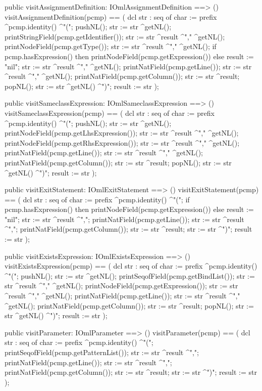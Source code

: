 \begin{vdm_al}
  public visitAssignmentDefinition: IOmlAssignmentDefinition ==> ()
  visitAssignmentDefinition(pcmp) ==
    ( dcl str : seq of char := prefix ^pcmp.identity() ^"(";
      pushNL();
      str := str ^getNL();
      printStringField(pcmp.getIdentifier());
      str := str ^result ^"," ^getNL();
      printNodeField(pcmp.getType());
      str := str ^result ^"," ^getNL();
      if pcmp.hasExpression()
      then printNodeField(pcmp.getExpression())
      else result := "nil";
      str := str ^result ^"," ^getNL();
      printNatField(pcmp.getLine());
      str := str ^result ^"," ^getNL();
      printNatField(pcmp.getColumn());
      str := str ^result;
      popNL();
      str := str ^getNL() ^")";
      result := str );

  public visitSameclassExpression: IOmlSameclassExpression ==> ()
  visitSameclassExpression(pcmp) ==
    ( dcl str : seq of char := prefix ^pcmp.identity() ^"(";
      pushNL();
      str := str ^getNL();
      printNodeField(pcmp.getLhsExpression());
      str := str ^result ^"," ^getNL();
      printNodeField(pcmp.getRhsExpression());
      str := str ^result ^"," ^getNL();
      printNatField(pcmp.getLine());
      str := str ^result ^"," ^getNL();
      printNatField(pcmp.getColumn());
      str := str ^result;
      popNL();
      str := str ^getNL() ^")";
      result := str );

  public visitExitStatement: IOmlExitStatement ==> ()
  visitExitStatement(pcmp) ==
    ( dcl str : seq of char := prefix ^pcmp.identity() ^"(";
      if pcmp.hasExpression()
      then printNodeField(pcmp.getExpression())
      else result := "nil";
      str := str ^result ^",";
      printNatField(pcmp.getLine());
      str := str ^result ^",";
      printNatField(pcmp.getColumn());
      str := str ^result;
      str := str ^")";
      result := str );

  public visitExistsExpression: IOmlExistsExpression ==> ()
  visitExistsExpression(pcmp) ==
    ( dcl str : seq of char := prefix ^pcmp.identity() ^"(";
      pushNL();
      str := str ^getNL();
      printSeqofField(pcmp.getBindList());
      str := str ^result ^"," ^getNL();
      printNodeField(pcmp.getExpression());
      str := str ^result ^"," ^getNL();
      printNatField(pcmp.getLine());
      str := str ^result ^"," ^getNL();
      printNatField(pcmp.getColumn());
      str := str ^result;
      popNL();
      str := str ^getNL() ^")";
      result := str );

  public visitParameter: IOmlParameter ==> ()
  visitParameter(pcmp) ==
    ( dcl str : seq of char := prefix ^pcmp.identity() ^"(";
      printSeqofField(pcmp.getPatternList());
      str := str ^result ^",";
      printNatField(pcmp.getLine());
      str := str ^result ^",";
      printNatField(pcmp.getColumn());
      str := str ^result;
      str := str ^")";
      result := str );


\end{vdm_al}
